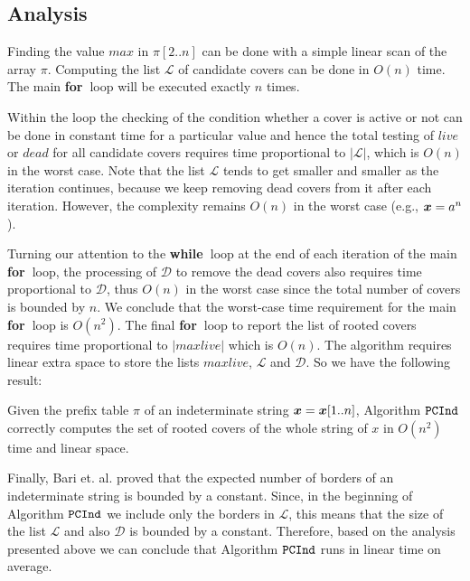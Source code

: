 \documentclass[runningheads,a4paper]{llncs}
\def\s#1{\mbox{\boldmath $#1$}}
\def\bfor{{\bf for\ }}
\def\bwhile{{\bf while\ }}
\def\PCInd{\tt{PCInd}}
\begin{document}
\subsection{Analysis}
Finding the value $max$ in $\pi[2..n]$ can be done with a simple linear
scan of the array $\pi$. Computing the list $\mathcal L$ of candidate covers can be
done in $O(n)$ time. The main \bfor loop will be executed exactly $n$ times.

Within the loop the checking of the condition whether a cover is active or not
can be done in constant
time for a particular value and hence the total testing of $live$ or $dead$ for
all candidate covers requires time proportional to $|\mathcal L|$, which is
$O(n)$ in the worst case. Note that the list $\mathcal L$ tends to get smaller
and smaller as the iteration continues, because we keep removing dead covers
from it after each iteration. However, the complexity remains $O(n)$ in the
worst case (e.g., $\s{x}= a^n$).

Turning our attention to the \bwhile loop at the end of each iteration of
the main \bfor loop, the processing of $\mathcal D$ to remove the dead
covers also requires time proportional to
$\mathcal D$, thus $O(n)$ in the worst case since the total number of
covers is bounded by $n$. We conclude that the worst-case time requirement
for the main \bfor loop is $O(n^2)$. The
final \bfor loop to report the list of rooted covers requires
time proportional to $|maxlive|$ which is $O(n)$.
The algorithm requires linear extra space to store the lists
$maxlive$, $\mathcal L$ and $\mathcal D$. So we have the following result:

\begin{theorem}
Given the prefix table $\pi$ of an indeterminate string $\s{x} =
\s{x}[1..n]$, Algorithm $\PCInd$ correctly computes the set of rooted covers
of the whole string of \s{x} in $O(n^2)$ time and  linear space.
\end{theorem} 

Finally, Bari et. al. \cite{BRS09} proved that the expected number
of borders of an indeterminate string is bounded by a constant.
Since, in the beginning of Algorithm $\PCInd$ we include only the borders in
$\mathcal L$, this means that the size of the list $\mathcal L$ and also
$\mathcal D$ is bounded by a constant. Therefore, based on the analysis
presented above we can conclude that Algorithm $\PCInd$ runs in linear time
on average.
\end{document}
